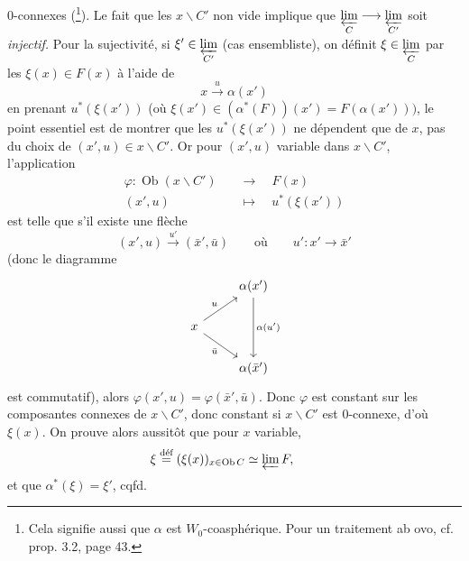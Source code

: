 \documentclass[11pt]{article}
\newcommand{\printedpage}[1]{\marginpar{\footnotesize p.~#1}}
\newcommand{\msp}[1]{\marginpar{\footnotesize [#1]}}
\begin{document}
\printedpage{4}
0-connexes (\footnote[4]{Cela signifie aussi que $\alpha$ est $W_0$-coasphérique. Pour un traitement ab ovo, cf. prop. 3.2, page 43.}). Le fait que les $x\backslash C'$ non vide implique que $\varprojlim\limits_{C} \longrightarrow \varprojlim\limits_{C'}$ soit \textit{injectif.} Pour la sujectivité, si $\xi' \in \varprojlim\limits_{C'}$ (cas ensembliste), on définit $\xi \in \varprojlim\limits_{C}$ par les $\xi(x) \in F(x)$ à l'aide de %
\msp{page 6}
\[ x \xrightarrow{u} \alpha(x') \]
en prenant $u^*(\xi(x'))$ (où $\xi(x') \in (\alpha^*(F))(x') = F(\alpha(x')))$, le point essentiel est de montrer que les $u^*(\xi(x'))$ ne dépendent que de $x$, pas du choix de $(x',u) \in x\backslash C'$. Or pour $(x',u)$ variable dans $x\backslash C'$, l'application
\[
\begin{aligned}
\varphi : \operatorname{Ob}(x\backslash C') &\quad\longrightarrow\quad F(x)\\
(x',u) &\quad\longmapsto\quad u^*(\xi(x'))
\end{aligned}
\]
est telle que s'il existe une flèche
\[ (x',u) \xrightarrow{u'} (\bar{x}',\bar{u}) \qquad \text{où} \qquad u' : x' \longrightarrow \bar{x}' \]
(donc le diagramme
\[
\begin{tikzcd}
 & \alpha(x') \arrow[dd, "\alpha(u')"] \\
x \arrow[ur, "u"] \arrow[dr, "\bar{u}"'] & \\
 & \alpha(\bar{x}')
\end{tikzcd}
\]
est commutatif), alors $\varphi(x',u) = \varphi(\bar{x}',\bar{u})$. Donc $\varphi$ est constant sur les composantes connexes de $x\backslash C'$, donc constant si $x\backslash C'$ est 0-connexe, d'où $\xi(x)$. On prouve alors aussitôt que pour $x$ variable,
\[ \xi \overset{\text{déf}}{=} (\xi(x))_{x\in\operatorname{Ob} C} \simeq \varprojlim F, \qquad \]
et que $\alpha^*(\xi) = \xi'$, cqfd.
\end{document}
